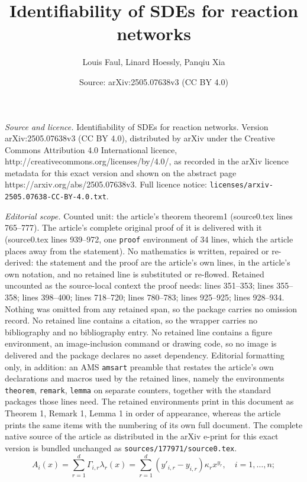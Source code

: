 \documentclass[10pt,a4paper]{amsart}
\title{\vspace*{-1.4cm}Identifiability of SDEs for reaction networks}
\author{Louis Faul, Linard Hoessly, Panqiu Xia}
\date{Source: arXiv:2505.07638v3 (CC BY 4.0)}
\def\la{\lambda}
\begin{document}
\maketitle

\noindent\emph{Source and licence.} \vspace*{-1.4cm}Identifiability of SDEs for reaction networks. Version arXiv:2505.07638v3 (CC BY 4.0), distributed by arXiv under the Creative Commons Attribution 4.0 International licence, http://creativecommons.org/licenses/by/4.0/, as recorded in the arXiv licence metadata for this exact version and shown on the abstract page https://arxiv.org/abs/2505.07638v3. Full licence notice: \texttt{licenses/arxiv-2505.07638-CC-BY-4.0.txt}.\par\smallskip

\noindent\textit{Editorial scope.} Counted unit: the article's theorem theorem1 (source0.tex lines 765--777). The article's complete original proof of it is delivered with it (source0.tex lines 939--972, one \texttt{proof} environment of 34 lines, which the article places away from the statement). No mathematics is written, repaired or re-derived: the statement and the proof are the article's own lines, in the article's own notation, and no retained line is substituted or re-flowed.  Retained uncounted as the source-local context the proof needs: lines 351--353; lines 355--358; lines 398--400; lines 718--720; lines 780--783; lines 925--925; lines 928--934.  Nothing was omitted from any retained span, so the package carries no omission record.  No retained line contains a citation, so the wrapper carries no bibliography and no bibliography entry.  No retained line contains a figure environment, an image-inclusion command or drawing code, so no image is delivered and the package declares no asset dependency.  Editorial formatting only, in addition: an AMS \texttt{amsart} preamble that restates the article's own declarations and macros used by the retained lines, namely the environments \texttt{theorem}, \texttt{remark}, \texttt{lemma} on separate counters, together with the standard packages those lines need.  The retained environments print in this document as Theorem 1, Remark 1, Lemma 1 in order of appearance, whereas the article prints the same items with the numbering of its own full document.  The complete native source of the article as distributed in the arXiv e-print for this exact version is bundled unchanged as \texttt{sources/177971/source0.tex}.
\begin{equation}\label{drift_vector}
      A_i(x) = \sum_{r=1}^d \Gamma_{i,r}\la_r(x) = \sum_{r=1}^d (y'_{i,r} - y_{i,r}) \kappa_r x^{y_r}, \quad i = 1,\dots, n;
\end{equation}
\end{document}
